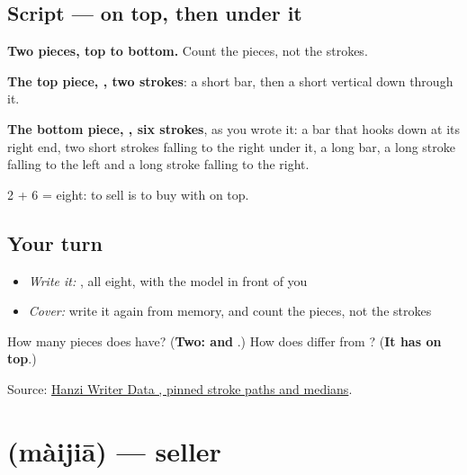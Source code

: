 \subsection*{Script —  on top, then  under it}

\begin{quote}
\end{quote}

\textbf{Two pieces, top to bottom.} Count the pieces, not the strokes.

\textbf{The top piece, , two strokes}: a short bar, then a short vertical down through it.

\textbf{The bottom piece, , six strokes}, as you wrote it: a bar that hooks down at its right end, two short strokes falling to the right under it, a long bar, a long stroke falling to the left and a long stroke falling to the right.

2 + 6 = eight: to sell is to buy with  on top.

\subsection*{Your turn}
\begin{itemize}
\raggedright
  \item \emph{Write it:} , all eight, with the model in front of you
  \item \emph{Cover:} write it again from memory, and count the pieces, not the strokes
\end{itemize}

\begin{tcolorbox}[breakable,colback=teal!4,colframe=teal!35!black,title={Before you move on}]
How many pieces does  have? (\textbf{Two:  and }.) How does  differ from ? (\textbf{It has  on top}.)

Source: \href{https://raw.githubusercontent.com/chanind/hanzi-writer-data/68d10a4b21150cae5e1ebbd223eed289cf32d90c/data/\%E5\%8D\%96.json}{Hanzi Writer Data , pinned stroke paths and medians}.
\end{tcolorbox}
\section[\texorpdfstring{\zh{卖家} (màijiā)}{卖家 (màijiā)}]{ (màijiā) — seller}

